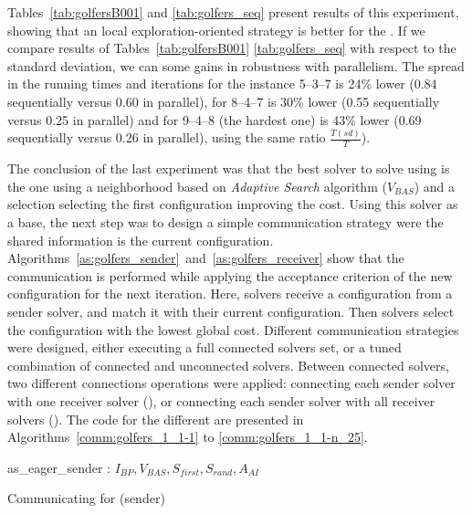 Tables~\ref{tab:golfersB001} and \ref{tab:golfers_seq} present results of this experiment, showing that an local exploration-oriented strategy is better for the \SGP. If we compare results of Tables~\ref{tab:golfersB001} \ref{tab:golfers_seq} with respect to the standard deviation, we can some gains in robustness with parallelism. The spread in the running times and iterations for the instance 5--3--7 is 24\% lower (0.84 sequentially versus 0.60 in parallel), for 8--4--7 is 30\% lower (0.55 sequentially versus 0.25 in parallel) and for 9--4--8 (the hardest one) is 43\% lower (0.69 sequentially versus 0.26 in parallel), using the same ratio $\tfrac{T(sd)}{T}$).

\separation

The conclusion of the last experiment was that the best solver to solve \SGP{} using \posl{} is the one using a neighborhood \om{} based on {\it Adaptive Search} algorithm ($V_{BAS}$) and a selection \om{} selecting the first configuration improving the cost. Using this solver as a base, the next step was to design a simple communication strategy were the shared information is the current configuration. Algorithms~\ref{as:golfers_sender}~and~\ref{as:golfers_receiver} show that the communication is performed while applying the acceptance criterion of the new configuration for the next iteration. Here, solvers receive a configuration from a sender solver, and match it with their current configuration. Then solvers select the configuration with the lowest global cost. Different communication strategies were designed, either executing a full connected solvers set, or a tuned combination of connected and unconnected solvers. Between connected solvers, two different connections operations were applied: connecting each sender solver with one receiver solver (\oneTone), or connecting each sender solver with all receiver solvers (\oneTn). The code for the different \commstrs{} are presented in Algorithms~\ref{comm:golfers_1_1-1} to \ref{comm:golfers_1_1-n_25}.

\begin{algorithm}
\dontprintsemicolon
\SetNoline
{}
   as\_eager\_sender\;
\algoindent {} : $I_{BP}, V_{BAS}, S_{first}, S_{rand}, A_{AI}$ \;
\caption{Communicating \as{} for \SGP{} (sender)}\label{as:golfers_sender}
\end{algorithm}

